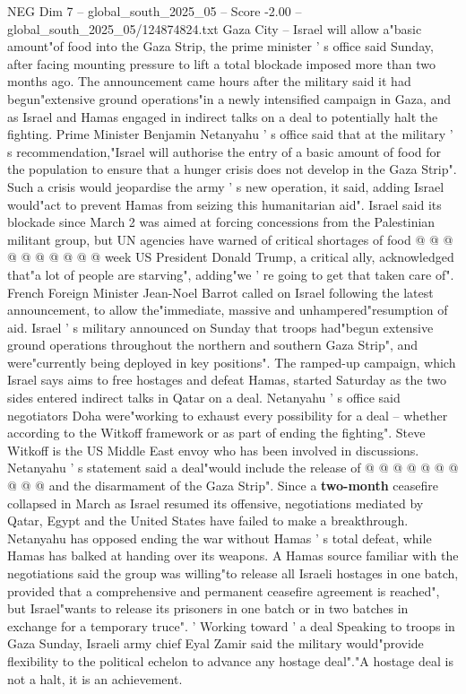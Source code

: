 \begin{textsample}{NEG Dim 7 – global\_south\_2025\_05 – Score -2.00 – global\_south\_2025\_05/124874824.txt}  \label{ex:f7_neg_007}
Gaza City -- Israel will allow a"basic amount"of food into the Gaza Strip, the prime minister ' s office said Sunday, after facing mounting pressure to lift a total blockade imposed more than two months ago.
The announcement came hours after the military said it had begun"extensive ground operations"in a newly intensified campaign in Gaza, and as Israel and Hamas engaged in indirect talks on a deal to potentially halt the fighting.
Prime Minister Benjamin Netanyahu ' s office said that at the military ' s recommendation,"Israel will authorise the entry of a basic amount of food for the population to ensure that a hunger crisis does not develop in the Gaza Strip".
Such a crisis would jeopardise the army ' s new operation, it said, adding Israel would"act to prevent Hamas from seizing this humanitarian aid".
Israel said its blockade since March 2 was aimed at forcing concessions from the Palestinian militant group, but UN agencies have warned of critical shortages of food @ @ @ @ @ @ @ @ @ @ week US President Donald Trump, a critical ally, acknowledged that"a lot of people are starving", adding"we ' re going to get that taken care of".
French Foreign Minister Jean-Noel Barrot called on Israel following the latest announcement, to allow the"immediate, massive and unhampered"resumption of aid.
Israel ' s military announced on Sunday that troops had"begun extensive ground operations throughout the northern and southern Gaza Strip", and were"currently being deployed in key positions".
The ramped-up campaign, which Israel says aims to free hostages and defeat Hamas, started Saturday as the two sides entered indirect talks in Qatar on a deal.
Netanyahu ' s office said negotiators Doha were"working to exhaust every possibility for a deal -- whether according to the Witkoff framework or as part of ending the fighting".
Steve Witkoff is the US Middle East envoy who has been involved in discussions.
Netanyahu ' s statement said a deal"would include the release of @ @ @ @ @ @ @ @ @ @ and the disarmament of the Gaza Strip".
Since a \textbf{two-month} ceasefire collapsed in March as Israel resumed its offensive, negotiations mediated by Qatar, Egypt and the United States have failed to make a breakthrough.
Netanyahu has opposed ending the war without Hamas ' s total defeat, while Hamas has balked at handing over its weapons.
A Hamas source familiar with the negotiations said the group was willing"to release all Israeli hostages in one batch, provided that a comprehensive and permanent ceasefire agreement is reached", but Israel"wants to release its prisoners in one batch or in two batches in exchange for a temporary truce". ' Working toward ' a deal Speaking to troops in Gaza Sunday, Israeli army chief Eyal Zamir said the military would"provide flexibility to the political echelon to advance any hostage deal"."A hostage deal is not a halt, it is an achievement.

\end{textsample}
